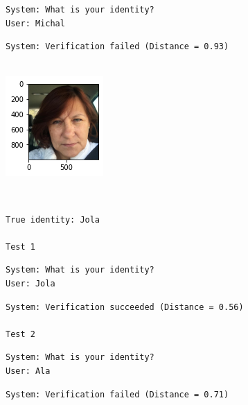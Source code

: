 \documentclass[11pt]{article}
\begin{document}
    \begin{Verbatim}[commandchars=\\\{\}]
System: What is your identity?
User: Michal
    \end{Verbatim}

    \begin{Verbatim}[commandchars=\\\{\}]
System: Verification failed (Distance = 0.93)


    \end{Verbatim}

    \begin{center}
    \includegraphics{output_32_6}
    \end{center}
    { \hspace*{\fill} \\}
    
    \begin{Verbatim}[commandchars=\\\{\}]
True identity: Jola

Test 1
    \end{Verbatim}

    \begin{Verbatim}[commandchars=\\\{\}]
System: What is your identity?
User: Jola
    \end{Verbatim}

    \begin{Verbatim}[commandchars=\\\{\}]
System: Verification succeeded (Distance = 0.56)

Test 2
    \end{Verbatim}

    \begin{Verbatim}[commandchars=\\\{\}]
System: What is your identity?
User: Ala
    \end{Verbatim}

    \begin{Verbatim}[commandchars=\\\{\}]
System: Verification failed (Distance = 0.71)


    \end{Verbatim}
\end{document}
